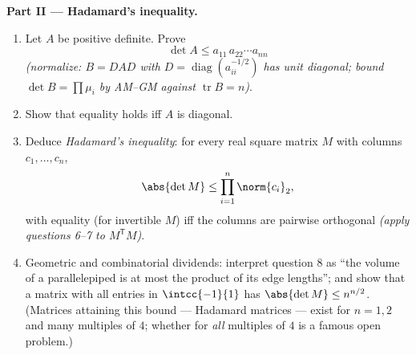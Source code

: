 \begin{problem}
\medskip
\noindent\textbf{Part II --- Hadamard's inequality.}
\begin{enumerate}[resume]
  \item Let $A$ be positive definite. Prove
        \[
        \det A \leq a_{11}\,a_{22}\cdots a_{nn}
        \]
        \emph{(normalize: $B = DAD$ with $D =
        \operatorname{diag}(a_{ii}^{-1/2})$ has unit diagonal;
        bound $\det B = \prod \mu_i$ by AM--GM against
        $\operatorname{tr} B = n$)}.
  \item Show that equality holds iff $A$ is diagonal.
  \item Deduce \emph{Hadamard's inequality}: for every real
        square matrix $M$ with columns $c_1, \dots, c_n$,
        \[
        \abs{\det M} \leq \prod_{i=1}^{n}\norm{c_i}_2 ,
        \]
        with equality (for invertible $M$) iff the columns are
        pairwise orthogonal \emph{(apply questions 6--7 to
        $M^{\mathsf T}M$)}.
  \item Geometric and combinatorial dividends: interpret
        question 8 as ``the volume of a parallelepiped is at
        most the product of its edge lengths''; and show that a
        matrix with all entries in $\intcc{-1}{1}$ has
        $\abs{\det M} \leq n^{n/2}$. (Matrices attaining this
        bound --- Hadamard matrices --- exist for $n = 1, 2$
        and many multiples of $4$; whether for \emph{all}
        multiples of $4$ is a famous open problem.)
\end{enumerate}


\end{problem}
